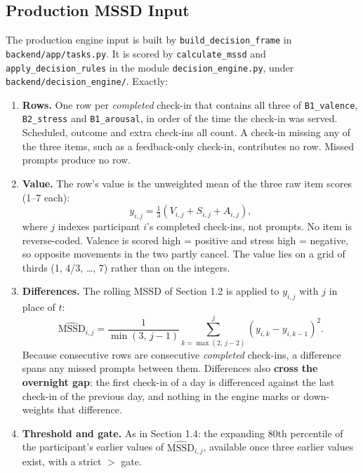 \documentclass[11pt,letterpaper]{article}
\begin{document}
\subsection{Production MSSD Input}

The production engine input is built by \texttt{build\_decision\_frame} in \texttt{backend/app/tasks.py}. It is scored by \texttt{calculate\_mssd} and \texttt{apply\_decision\_rules} in the module \texttt{decision\_engine.py}, under \texttt{backend/decision\_engine/}. Exactly:

\begin{enumerate}
    \item \textbf{Rows.} One row per \emph{completed} check-in that contains all three of \texttt{B1\_valence}, \texttt{B2\_stress} and \texttt{B1\_arousal}, in order of the time the check-in was served. Scheduled, outcome and extra check-ins all count. A check-in missing any of the three items, such as a feedback-only check-in, contributes no row. Missed prompts produce no row.
    \item \textbf{Value.} The row's value is the unweighted mean of the three raw item scores (1--7 each):
    \begin{equation}
    y_{i,j} = \tfrac{1}{3}\left(V_{i,j} + S_{i,j} + A_{i,j}\right),
    \end{equation}
    where $j$ indexes participant $i$'s completed check-ins, not prompts. No item is reverse-coded. Valence is scored high = positive and stress high = negative, so opposite movements in the two partly cancel. The value lies on a grid of thirds (1, 4/3, \dots, 7) rather than on the integers.
    \item \textbf{Differences.} The rolling MSSD of Section 1.2 is applied to $y_{i,j}$ with $j$ in place of $t$:
    \begin{equation}
    \widehat{\text{MSSD}}_{i,j} = \frac{1}{\min(3,\, j - 1)} \sum_{k=\max(2,\, j - 2)}^{j} (y_{i,k} - y_{i,k-1})^2 .
    \end{equation}
    Because consecutive rows are consecutive \emph{completed} check-ins, a difference spans any missed prompts between them. Differences also \textbf{cross the overnight gap}: the first check-in of a day is differenced against the last check-in of the previous day, and nothing in the engine marks or down-weights that difference.
    \item \textbf{Threshold and gate.} As in Section 1.4: the expanding 80th percentile of the participant's earlier values of $\widehat{\text{MSSD}}_{i,j}$, available once three earlier values exist, with a strict $>$ gate.
\end{enumerate}
\end{document}
